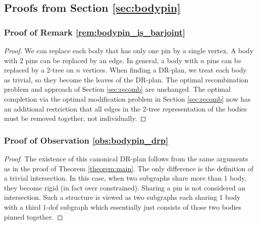 \subsection{Proofs from Section \ref{sec:bodypin}}

\subsubsection{Proof of Remark \ref{rem:bodypin_is_barjoint}}
\begin{proof}
    We can replace each body that has only one pin by a single vertex. A body with 2 pins can be replaced by an edge. In general, a body with $n$ pins can be replaced by a 2-tree on $n$ vertices. When finding a DR-plan, we treat each body as trivial, so they become the leaves of the DR-plan. The optimal recombination problem and approach of Section \ref{sec:recomb} are unchanged. The optimal completion via the optimal modification problem in Section \ref{sec:recomb} now has an additional restriction that all edges in the 2-tree representation of the bodies must be removed together, not individually.
\end{proof}

\subsubsection{Proof of Observation \ref{obs:bodypin_drp}}
\begin{proof}
    The existence of this canonical DR-plan follows from the same arguments as in the proof of Theorem \ref{theorem:main}. The only difference is the definition of a trivial intersection. In this case, when two subgraphs share more than 1 body, they become rigid (in fact over constrained). Sharing a pin is not considered an intersection. Such a structure is viewed as two subgraphs each sharing 1 body with a third 1-dof subgraph which essentially just consists of those two bodies pinned together.
\end{proof}

